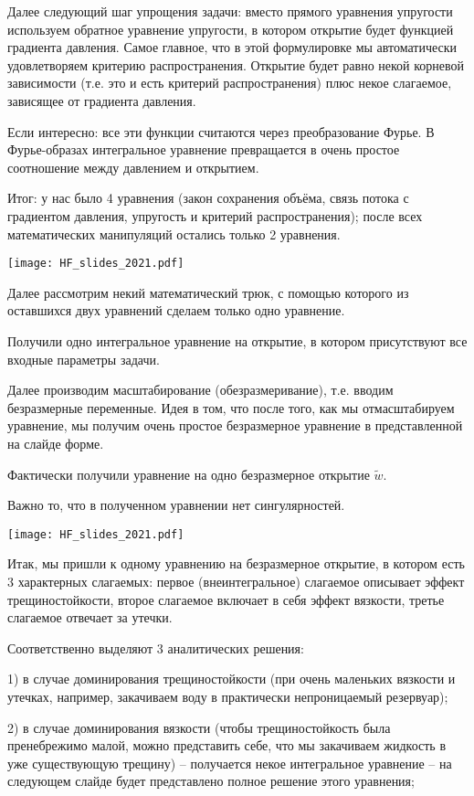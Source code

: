 \documentclass[main.tex]{subfiles}
\begin{document}
Далее следующий шаг упрощения задачи: вместо прямого уравнения упругости используем обратное уравнение упругости, в котором открытие будет функцией градиента давления.
Самое главное, что в этой формулировке мы автоматически удовлетворяем критерию распространения.
Открытие будет равно некой корневой зависимости (т.е. это и есть критерий распространения) плюс некое слагаемое, зависящее от градиента давления.

Если интересно: все эти функции считаются через преобразование Фурье.
В Фурье-образах интегральное уравнение превращается в очень простое соотношение между давлением и открытием.

Итог: у нас было 4 уравнения (закон сохранения объёма, связь потока с градиентом давления, упругость и критерий распространения); после всех математических манипуляций остались только 2 уравнения.

\texttt{[image: HF\_slides\_2021.pdf]}

Далее рассмотрим некий математический трюк, с помощью которого из оставшихся двух уравнений сделаем только одно уравнение.

Получили одно интегральное уравнение на открытие, в котором присутствуют все входные параметры задачи.

Далее производим масштабирование (обезразмеривание), т.е. вводим безразмерные переменные.
Идея в том, что после того, как мы отмасштабируем уравнение, мы получим очень простое безразмерное уравнение в представленной на слайде форме.

Фактически получили уравнение на одно безразмерное открытие $\tilde{w}$.

Важно то, что в полученном уравнении нет сингулярностей.

\texttt{[image: HF\_slides\_2021.pdf]}

Итак, мы пришли к одному уравнению на безразмерное открытие, в котором есть 3 характерных слагаемых: первое (внеинтегральное) слагаемое описывает эффект трещиностойкости, второе слагаемое включает в себя эффект вязкости, третье слагаемое отвечает за утечки.

Соответственно выделяют 3 аналитических решения:

1) в случае доминирования трещиностойкости (при очень маленьких вязкости и утечках, например, закачиваем воду в практически непроницаемый резервуар);

2) в случае доминирования вязкости (чтобы трещиностойкость была пренебрежимо малой, можно представить себе, что мы закачиваем жидкость в уже существующую трещину) -- получается некое интегральное уравнение -- на следующем слайде будет представлено полное решение этого уравнения;
\end{document}
